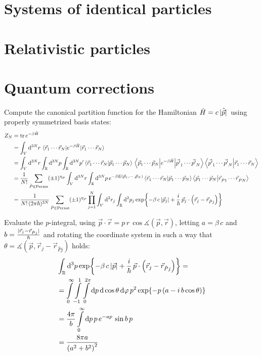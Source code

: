 \documentclass[11pt,a4paper]{scrartcl}
\begin{document}
\section{Systems of identical particles}


\section{Relativistic particles}


\section{Quantum corrections}

Compute the canonical partition function for the Hamiltonian
$\hat{H}=c\,\abs*{\hat{\vec{p}}}$ using properly symmetrized basis states:
\begin{align*}
    Z_N &= \tr e^{-\beta\hat{H}} \\
    &=
    \int_{V}\dd[3N]{r}\ev{e^{-\beta\hat{H}}}{\vec{r}_{1}\cdots\vec{r}_{N}} \\
    &= \int_{V}\dd[3N]{r}\int_{\mathbb{R}}\dd[3N]{p}\int_{\mathbb{R}}\dd[3N]{p'}
    \braket{\vec{r}_{1}\cdots\vec{r}_{N}}{\vec{p}_{1}\cdots\vec{p}_{N}}
    \mel{\vec{p}_{1}\cdots\vec{p}_{N}}{e^{-\beta\hat{H}}}{\vec{p'}_{1}\cdots\vec{p'}_{N}}
    \braket{\vec{p'}_{1}\cdots\vec{p'}_{N}}{\vec{r}_{1}\cdots\vec{r}_{N}} \\
    &= \frac{1}{N!}\sum_{\hat{P}\in\mathrm{Perms}}(\pm1)^{\eta_{\hat{P}}}
    \int_{V}\dd[3N]{r}\int_{\mathbb{R}}\dd[3N]{p}e^{-\beta
        E(\vec{p}_{1},\cdots,\vec{p}_{N})}
    \braket{\vec{r}_{1}\cdots\vec{r}_{N}}{\vec{p}_{1}\cdots\vec{p}_{N}}
    \braket{\vec{p}_{1}\cdots\vec{p}_{N}}{\vec{r}_{\hat{P}1}\cdots\vec{r}_{\hat{P}N}}
    \\
    &=
    \frac{1}{N!\,(2\pi\hbar)^{3N}}\sum_{\hat{P}\in\mathrm{Perms}}(\pm1)^{\eta_{\hat{P}}}
    \prod_{j=1}^{N}\int_{V}\dd[3]{r_j}\int_{\mathbb{R}}\dd[3]{p_j}
    \exp{-\beta\,c\,\abs{\vec{p}_j}
    +\frac{i}{\hbar}\,\vec{p}_{j}\cdot\left(\vec{r}_{j}-\vec{r}_{\hat{P}j}\right)}
\end{align*}

Evaluate the $p$-integral, using $\vec{p}\cdot\vec{r}=p\,r\,\cos\measuredangle(\vec{p},
\vec{r})$, letting $a=\beta\,c$ and
$b=\frac{\abs*{\vec{r}_{j}-\vec{r}_{\hat{P}j}}}{\hbar}$ and rotating the
coordinate system in such a way that $\theta=\measuredangle(\vec{p},
\vec{r}_{j}-\vec{r}_{\hat{P}j})$ holds:
\begin{align*}
    &\int_{\mathbb{R}}\dd[3]{p}\exp{-\beta\,c\,\abs{\vec{p}}+\frac{i}{\hbar}\,\vec{p}\cdot\left(\vec{r}_{j}-\vec{r}_{\hat{P}j}\right)}
    =\\&=
    \int\limits_{0}^{\infty}\int\limits_{-1}^{1}\int\limits_{0}^{2\pi}\dd{p}\dd{\cos\theta}\dd{\varphi}
    p^2\exp{-p\left(a-i\,b\cos\theta\right)} \\
    &= \frac{4\pi}{b}\int\limits_{0}^{\infty}\dd{p}p\,e^{-ap}\,\sin b\,p \\
    &= \frac{8\pi a}{\left(a^2+b^2\right)^2}
\end{align*}
\end{document}
